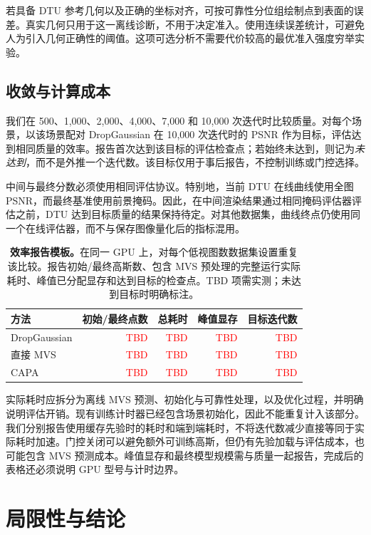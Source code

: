 \documentclass{article}
\newcommand{\ours}{CAPA}
\newcommand{\PH}[1]{\textcolor{red}{#1}}
\newcommand{\pending}{\PH{\textnormal{TBD}}}
\begin{document}
若具备 DTU 参考几何以及正确的坐标对齐，可按可靠性分位组绘制点到表面的误差。真实几何只用于这一离线诊断，不用于决定准入。使用连续误差统计，可避免人为引入几何正确性的阈值。这项可选分析不需要代价较高的最优准入强度穷举实验。

\subsection{收敛与计算成本}
\label{sec:efficiency}

我们在 500、1,000、2,000、4,000、7,000 和 10,000 次迭代时比较质量。对每个场景，以该场景配对 DropGaussian 在 10,000 次迭代时的 PSNR 作为目标，评估达到相同质量的效率。报告首次达到该目标的评估检查点；若始终未达到，则记为\emph{未达到}，而不是外推一个迭代数。该目标仅用于事后报告，不控制训练或门控选择。

中间与最终分数必须使用相同评估协议。特别地，当前 DTU 在线曲线使用全图 PSNR，而最终基准使用前景掩码。因此，在中间渲染结果通过相同掩码评估器评估之前，DTU 达到目标质量的结果保持待定。对其他数据集，曲线终点仍使用同一个在线评估器，而不与保存图像量化后的指标混用。

\begin{table}[t]
\caption{\textbf{效率报告模板。}在同一 GPU 上，对每个低视图数数据集设置重复该比较。报告初始/最终高斯数、包含 MVS 预处理的完整运行实际耗时、峰值已分配显存和达到目标的检查点。TBD 项需实测；未达到目标时明确标注。}
\label{tab:efficiency}
\centering\small
\setlength{\tabcolsep}{4pt}
\begin{tabular}{@{}lrrrr@{}}
\toprule
方法 & 初始/最终点数 & 总耗时 & 峰值显存 & 目标迭代数\\
\midrule
DropGaussian & \pending & \pending & \pending & \pending\\
直接 MVS & \pending & \pending & \pending & \pending\\
\ours{} & \pending & \pending & \pending & \pending\\
\bottomrule
\end{tabular}
\end{table}

实际耗时应拆分为离线 MVS 预测、初始化与可靠性处理，以及优化过程，并明确说明评估开销。现有训练计时器已经包含场景初始化，因此不能重复计入该部分。我们分别报告使用缓存先验时的耗时和端到端耗时，不将迭代数减少直接等同于实际耗时加速。门控关闭可以避免额外可训练高斯，但仍有先验加载与评估成本，也可能包含 MVS 预测成本。峰值显存和最终模型规模需与质量一起报告，完成后的表格还必须说明 GPU 型号与计时边界。

\section{局限性与结论}
\label{sec:conclusion}
\end{document}
